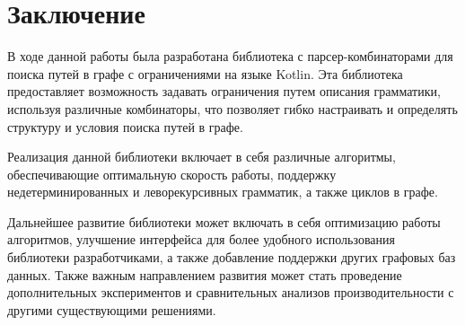 \chapter*{Заключение}                       %

В ходе данной работы была разработана библиотека с парсер-комбинаторами для поиска путей в графе с ограничениями на языке Kotlin. Эта библиотека предоставляет возможность задавать ограничения путем описания грамматики, используя различные комбинаторы, что позволяет гибко настраивать и определять структуру и условия поиска путей в графе.

Реализация данной библиотеки включает в себя различные алгоритмы, обеспечивающие оптимальную скорость работы, поддержку недетерминированных и леворекурсивных грамматик, а также циклов в графе.

Дальнейшее развитие библиотеки может включать в себя оптимизацию работы алгоритмов, улучшение интерфейса для более удобного использования библиотеки разработчиками,  а также добавление поддержки других графовых баз данных. Также важным направлением развития может стать проведение дополнительных экспериментов и сравнительных анализов производительности с другими существующими решениями.
